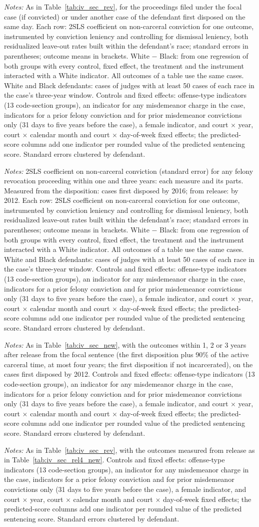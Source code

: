 \documentclass[11pt]{article}
\newcommand{\tabnote}[1]{\par\vspace{0.6ex}\begin{minipage}{\linewidth}\linespread{1}\footnotesize\textit{Notes:} #1\end{minipage}}
\newcommand{\controlsnote}{offense-type indicators (13 code-section groups), an indicator for any misdemeanor charge in the case, indicators for a prior felony conviction and for prior misdemeanor convictions only (31 days to five years before the case), a female indicator, and court $\times$ year, court $\times$ calendar month and court $\times$ day-of-week fixed effects}
\newcommand{\specnotesec}{Controls and fixed effects: \controlsnote; the predicted-score columns add one indicator per rounded value of the predicted sentencing score. Standard errors clustered by defendant.}
\newcommand{\racesamplenote}{White and Black defendants: cases of judges with at least 50 cases of each race in the case's three-year window.}
\newcommand{\ivnote}{Each row: 2SLS coefficient on non-carceral conviction for one outcome, instrumented by conviction leniency and controlling for dismissal leniency, both residualized leave-out rates built within the defendant's race; standard errors in parentheses; outcome means in brackets. White $-$ Black: from one regression of both groups with every control, fixed effect, the treatment and the instrument interacted with a White indicator. All outcomes of a table use the same cases. \racesamplenote}
\begin{document}
\begin{table}[H]
\centering
\caption{2SLS from the disposition: non-carceral conviction and revocations of the focal sentences, secondary analysis}\label{tab:iv_sec_revf}
{\small\linespread{1}\selectfont\renewcommand{\arraystretch}{0.9}}
\tabnote{As in Table~\ref{tab:iv_sec_rev}, for the proceedings filed under the focal case (if convicted) or under another case of the defendant first disposed on the same day. \ivnote{} \specnotesec}
\end{table}

\begin{table}[H]
\centering
\caption{2SLS on revocation proceedings from the disposition and from release: the two measures and their parts, secondary analysis without the score control}\label{tab:rev_parts_sec}
{\small\renewcommand{\arraystretch}{0.9}\resizebox{\textwidth}{!}{}}
\tabnote{2SLS coefficient on non-carceral conviction (standard error) for any felony revocation proceeding within one and three years: each measure and its parts. Measured from the disposition: cases first disposed by 2016; from release: by 2012. \ivnote{} \specnotesec}
\end{table}

\begin{table}[H]
\centering
\caption{2SLS from release, time served at most four years: new felony cases, secondary analysis}\label{tab:iv_sec_rel4_new}
{\small\linespread{1}\selectfont\renewcommand{\arraystretch}{0.9}}
\tabnote{As in Table~\ref{tab:iv_sec_new}, with the outcomes within 1, 2 or 3 years after release from the focal sentence (the first disposition plus 90\% of the active carceral time, at most four years; the first disposition if not incarcerated), on the cases first disposed by 2012. \specnotesec}
\end{table}

\begin{table}[H]
\centering
\caption{2SLS from release, time served at most four years: revocations of other sentences, secondary analysis}\label{tab:iv_sec_rel4_rev}
{\small\linespread{1}\selectfont\renewcommand{\arraystretch}{0.9}}
\tabnote{As in Table~\ref{tab:iv_sec_rev}, with the outcomes measured from release as in Table~\ref{tab:iv_sec_rel4_new}. \specnotesec}
\end{table}
\end{document}
